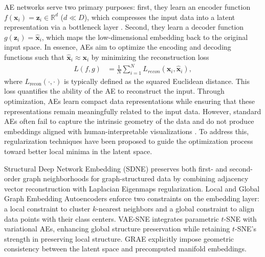 AE networks serve two primary purposes: first, they learn an encoder function \( f(\mathbf{x}_i) = \mathbf{z}_i \in \mathbb{R}^d \) (\( d \ll D \)), which compresses the input data into a latent representation via a bottleneck layer \cite{theis2017lossy}. Second, they learn a decoder function \( g(\mathbf{z}_i) = \hat{\mathbf{x}}_i \), which maps the low-dimensional embedding back to the original input space. In essence, AEs aim to optimize the encoding and decoding functions such that \( \hat{\mathbf{x}}_i \approx \mathbf{x}_i \) by minimizing the reconstruction loss
\begin{align*}
    L(f, g) &= \frac{1}{N} \sum_{i=1}^N L_{recon}(\mathbf{x}_i, \hat{\mathbf{x}}_i),
\end{align*}
where \( L_{\text{recon}}(\cdot, \cdot) \) is typically defined as the squared Euclidean distance. This loss quantifies the ability of the AE to reconstruct the input. Through optimization, AEs learn compact data representations while ensuring that these representations remain meaningfully related to the input data. However, standard AEs often fail to capture the intrinsic geometry of the data and do not produce embeddings aligned with human-interpretable visualizations \cite{duque2022geometry}. To address this, regularization techniques have been proposed to guide the optimization process toward better local minima in the latent space.

Structural Deep Network Embedding (SDNE) \cite{Wang2016sdne} preserves both first- and second-order graph neighborhoods for graph-structured data by combining adjacency vector reconstruction with Laplacian Eigenmaps \cite{belkin2001laplacian} regularization. Local and Global Graph Embedding Autoencoders \cite{wang2020lgae} enforce two constraints on the embedding layer: a local constraint to cluster \( k \)-nearest neighbors and a global constraint to align data points with their class centers. VAE-SNE \cite{graving2020vae-sne} integrates parametric $t$-SNE with variational AEs, enhancing global structure preservation while retaining $t$-SNE's strength in preserving local structure. GRAE \cite{duque2022geometry} explicitly impose geometric consistency between the latent space and precomputed manifold embeddings.

